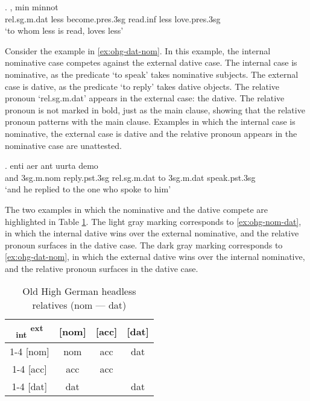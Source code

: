 \exg.    , min minnot\\
\ac{rel}.\ac{sg}.\ac{m}.\ac{dat} less become.\ac{pres}.3\ac{sg} read.\ac{inf}\scsub{[dat]} less love.\ac{pres}.3\ac{sg}\scsub{[nom]}\\
`to whom less is read, loves less' \label{ex:ohg-nom-dat}

Consider the example in \ref{ex:ohg-dat-nom}. In this example, the internal nominative case competes against the external dative case.
The internal case is nominative, as the predicate  `to speak' takes nominative subjects.
The external case is dative, as the predicate  `to reply' takes dative objects.
The relative pronoun  `\ac{rel}.\ac{sg}.\ac{m}.\ac{dat}' appears in the external case: the dative. The relative pronoun is not marked in bold, just as the main clause, showing that the relative pronoun patterns with the main clause.
Examples in which the internal case is nominative, the external case is dative and the relative pronoun appears in the nominative case are unattested.

\exg. enti aer {ant uurta} demo  \\
and 3\ac{sg}.\ac{m}.\ac{nom} reply.\ac{pst}.3\ac{sg}\scsub{[dat]} \ac{rel}.\ac{sg}.\ac{m}.\ac{dat} {to 3\ac{sg}.\ac{m}.\ac{dat}} speak.\ac{pst}.3\ac{sg}\scsub{[nom]}\\
`and he replied to the one who spoke to him' \label{ex:ohg-dat-nom}

The two examples in which the nominative and the dative compete are highlighted in Table \ref{tbl:summary-old-high-german-nom-dat}. The light gray marking corresponds to \ref{ex:ohg-nom-dat}, in which the internal dative wins over the external nominative, and the relative pronoun surfaces in the dative case. The dark gray marking corresponds to \ref{ex:ohg-dat-nom}, in which the external dative wins over the internal nominative, and the relative pronoun surfaces in the dative case.

\begin{table}[H]
  \center
  \caption{Old High German headless relatives (\ac{nom} --- \ac{dat})}
  \begin{tabular}{c|c|c|c}
    \toprule
        \textsubscript{\ac{int}} \textsuperscript{\ac{ext}}
          & [\ac{nom}]
          & [\ac{acc}]
          & [\ac{dat}]
          \\ \cmidrule{1-4}
      [\ac{nom}]
          & \ac{nom}
          & \ac{acc}
          & \cellcolor{DG}\ac{dat}
          \\ \cmidrule{1-4}
      [\ac{acc}]
          & \ac{acc}
          & \ac{acc}
          &
          \\ \cmidrule{1-4}
      [\ac{dat}]
          & \cellcolor{LG}\ac{dat}
          &
          & \ac{dat}
          \\
    \bottomrule
  \end{tabular}
    \label{tbl:summary-old-high-german-nom-dat}
\end{table}

